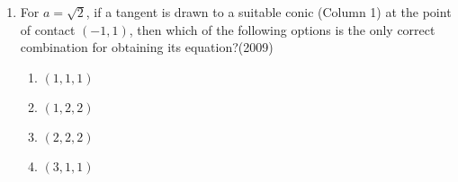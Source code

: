 \begin{enumerate}[label=\thesubsection.\arabic*.,ref=\thesubsection.\theenumi]
\begin{table}[h!]
\begin{tabular}{|c|c|c|c|}
\hline
\end{tabular}
\end{table}
%
\begin{enumerate}
\item For $a =\sqrt{2}$, if a tangent is drawn to a suitable conic (Column 1) at the point of contact $(-1, 1)$, then which of the following
options is the only correct combination for obtaining its equation?\hfill{(2009)}
%
\begin{multicols}{4}
\begin{enumerate}
	\item $(1,1,1)$
    \item $(1,2,2)$
    \item $(2,2,2)$
    \item $(3,1,1)$
\end{enumerate}
\end{multicols}


\end{enumerate}
\end{enumerate}
